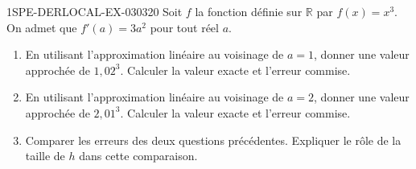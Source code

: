 \begin{exercice}{1SPE-DERLOCAL-EX-030}{3}{20}
Soit $f$ la fonction définie sur $\mathbb{R}$ par $f(x) = x^3$. On admet que $f'(a) = 3a^2$ pour tout réel $a$.

\begin{enumerate}
  \item En utilisant l'approximation linéaire au voisinage de $a = 1$, donner une valeur approchée de $1{,}02^3$. Calculer la valeur exacte et l'erreur commise.
  \item En utilisant l'approximation linéaire au voisinage de $a = 2$, donner une valeur approchée de $2{,}01^3$. Calculer la valeur exacte et l'erreur commise.
  \item Comparer les erreurs des deux questions précédentes. Expliquer le rôle de la taille de $h$ dans cette comparaison.
\end{enumerate}
\end{exercice}
